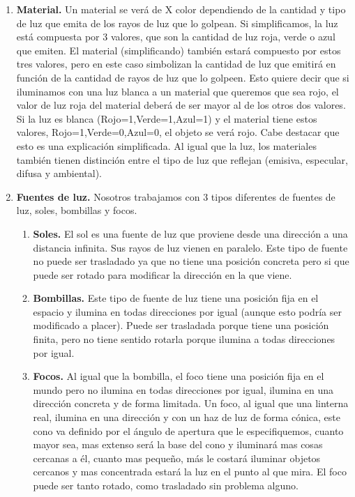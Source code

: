 \documentclass[12pt,a4paper]{article}
\begin{document}
\begin{enumerate}
\begin{enumerate}
\item \textbf{Material.}
Un material se verá de X color dependiendo de la cantidad y tipo de luz que emita de los rayos de luz que lo golpean. Si simplificamos, la luz está compuesta por 3 valores, que son la cantidad de luz roja, verde o azul que emiten. El material (simplificando) también estará compuesto por estos tres valores, pero en este caso simbolizan la cantidad de luz que emitirá en función de la cantidad de rayos de luz que lo golpeen. Esto quiere decir que si iluminamos con una luz blanca a un material que queremos que sea rojo, el valor de luz roja del material deberá de ser mayor al de los otros dos valores. Si la luz es blanca (Rojo=1,Verde=1,Azul=1) y el material tiene estos valores, {Rojo=1,Verde=0,Azul=0}, el objeto se verá rojo.\newline
Cabe destacar que esto es una explicación simplificada. Al igual que la luz, los materiales también tienen distinción entre el tipo de luz que reflejan (emisiva, especular, difusa y ambiental).

\item \textbf{Fuentes de luz.}
Nosotros trabajamos con 3 tipos diferentes de fuentes de luz, soles, bombillas y focos. 
\begin{enumerate}
\item\textbf{Soles.}
El sol es una fuente de luz que proviene desde una dirección a una distancia infinita. Sus rayos de luz vienen en paralelo.\newline
Este tipo de fuente no puede ser trasladado ya que no tiene una posición concreta pero si que puede ser rotado para modificar la dirección en la que viene.
\item\textbf{Bombillas.}
Este tipo de fuente de luz tiene una posición fija en el espacio y ilumina en todas direcciones por igual (aunque esto podría ser modificado a placer).\newline
Puede ser trasladada porque tiene una posición finita, pero no tiene sentido rotarla porque ilumina a todas direcciones por igual.
\item\textbf{Focos.}
Al igual que la bombilla, el foco tiene una posición fija en el mundo pero no ilumina en todas direcciones por igual, ilumina en una dirección concreta y de forma limitada. Un foco, al igual que una linterna real, ilumina en una dirección y con un haz de luz de forma cónica, este cono va definido por el ángulo de apertura que le especifiquemos, cuanto mayor sea, mas extenso será la base del cono y iluminará mas cosas cercanas a él, cuanto mas pequeño, más le costará iluminar objetos cercanos y mas concentrada estará la luz en el punto al que mira.\newline 
El foco puede ser tanto rotado, como trasladado sin problema alguno.
\end{enumerate}
\end{enumerate}


\end{enumerate}
\end{document}
